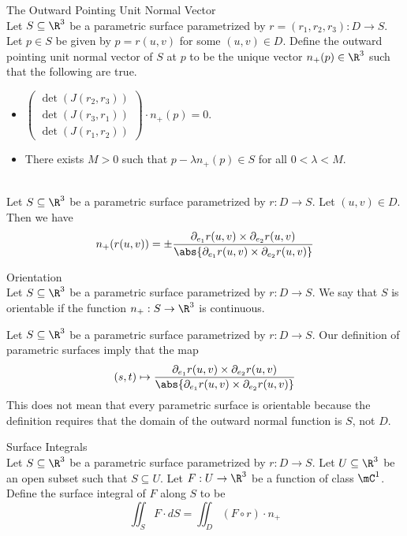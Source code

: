 \documentclass[a4paper]{article}
\begin{document}
\begin{defn}{The Outward Pointing Unit Normal Vector}{}\\
Let $S\subseteq\R^3$ be a parametric surface parametrized by $r=(r_1,r_2,r_3):D\to S$. Let $p\in S$ be given by $p=r(u,v)$ for some $(u,v)\in D$. Define the outward pointing unit normal vector of $S$ at $p$ to be the unique vector $n_+(p)\in\R^3$ such that the following are true. 
\begin{itemize}
\item $\begin{pmatrix}\det(J(r_2,r_3))\\\det(J(r_3,r_1))\\\det(J(r_1,r_2))\end{pmatrix}\cdot n_+(p)=0$. 
\item There exists $M>0$ such that $p-\lambda n_+(p)\in S$ for all $0<\lambda<M$. 
\end{itemize}
\end{defn}

\begin{lmm}{}{}\\
Let $S\subseteq\R^3$ be a parametric surface parametrized by $r:D\to S$. Let $(u,v)\in D$. Then we have $$n_+(r(u,v))=\pm\frac{\partial_{e_1}r(u,v)\times\partial_{e_2}r(u,v)}{\abs{\partial_{e_1}r(u,v)\times\partial_{e_2}r(u,v)}}$$
\end{lmm}

\begin{defn}{Orientation}{}\\
Let $S\subseteq\R^3$ be a parametric surface parametrized by $r:D\to S$. We say that $S$ is orientable if the function $n_+:S\to\R^3$ is continuous. 
\end{defn}

Let $S\subseteq\R^3$ be a parametric surface parametrized by $r:D\to S$. Our definition of parametric surfaces imply that the map $$(s,t)\mapsto\frac{\partial_{e_1}r(u,v)\times\partial_{e_2}r(u,v)}{\abs{\partial_{e_1}r(u,v)\times\partial_{e_2}r(u,v)}}$$ This does not mean that every parametric surface is orientable because the definition requires that the domain of the outward normal function is $S$, not $D$. 

\begin{defn}{Surface Integrals}{}\\
Let $S\subseteq\R^3$ be a parametric surface parametrized by $r:D\to S$. Let $U\subseteq\R^3$ be an open subset such that $S\subseteq U$. Let $F:U\to\R^3$ be a function of class $\mC^1$. Define the surface integral of $F$ along $S$ to be $$\iint_S F\cdot dS=\iint_D(F\circ r)\cdot n_+$$
\end{defn}
\end{document}
